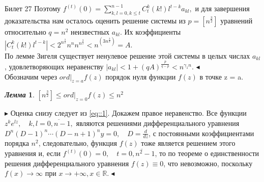 \documentclass[a4paper,12pt]{article}
\newtheorem{lem}{\textit{Лемма}}
\newcommand{\ee}{\equiv}
\newcommand{\q}{\quad}
\newcommand{\pb}{\blacktriangleright}
\newcommand{\pe}{\blacktriangleleft}
\newcommand{\bb}[1]{\mathbb{#1}}
\newcommand{\SL}{\sum\limits}
\begin{document}
\newpage
\begin{mybox}{{Билет 27}}
Поэтому $f^{(t)}(0) = \SL_{k,l=0, k\le t}^{n-1}C^k_t (k!)l^{t-k}a_{kl},$ и для завершения доказательства нам осталось оценить решение системы из $p = [n^{\frac{3}{2}}]$ уравнений относительно $q = n^2$ неизвестных $a_{kl}$. Их коэффициенты $|C^k_t (k!)l^{t-k}| < 2^{n^{\frac{3}{2}}}n^n n^{n^{\frac{3}{2}}} < n^{(3n^{\frac{3}{2}})} = A$.\\
По лемме Зигеля существует ненулевое решение этой системы в целых числах $a_{kl}$, удовлетворяющих неравенству $|a_{kl}| < 1 + (qA)^{\frac{p}{q-p}} < n^{\gamma_1n}$. $\pe$\\


Обозначим через $ord|_{z=a} f(z)$ порядок нуля функции $f(z)$ в точке z = a.

\begin{formbox}{}
\begin{lem}
$[n^{\frac{3}{2}}]\le ord|_{z=0} f(z) \le n^2 $
\end{lem}
\end{formbox}

$\pb$ Оценка снизу следует из \ref{eq::1}. Докажем правое неравенство. Все функции $z^ke^{lz},\q k, l = \overline{0, n-1},$ являются решениями дифференциального уравнения $D^n(D- 1)^n\cdots(D - n + 1)^ny = 0,\q D =\frac{d}{dz} $, с постоянными коэффициентами порядка $n^2$, следовательно, функция $f(z)$ тоже является решением этого уравнения и, если $f^{(t)}(0) = 0, \q t = \overline{0, n^2-1}$, то по теореме о единственности решения дифференциального уравнения $f(z) \ee 0$, что невозможно, поскольку $f(x) \to\infty$ при $x \to +\infty, x \in \bb{R}.\pe$


\end{mybox}
\end{document}
